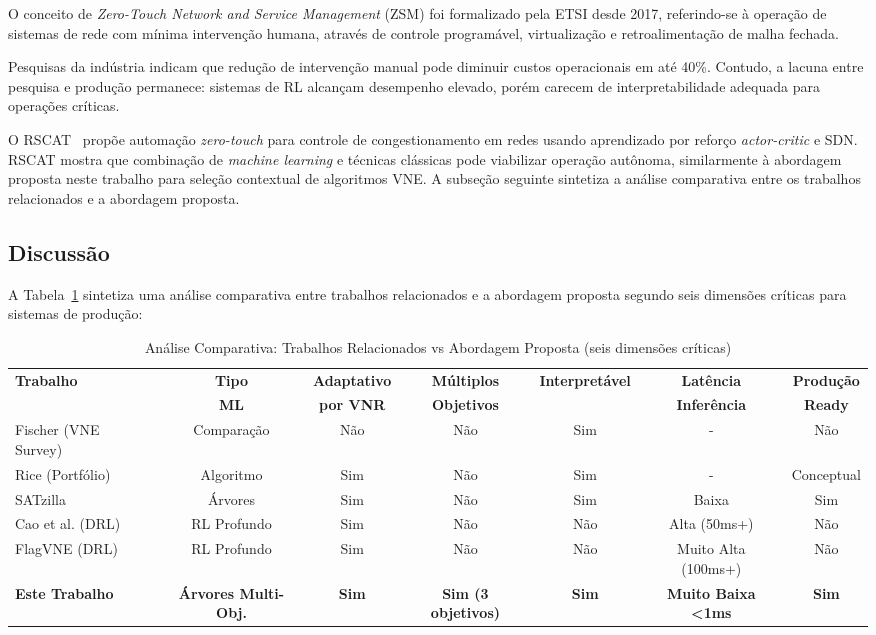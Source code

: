 \documentclass[conference]{IEEEtran}
\begin{document}
O conceito de \textit{Zero-Touch Network and Service Management} (ZSM) foi formalizado pela ETSI desde 2017, referindo-se à operação de sistemas de rede com mínima intervenção humana, através de controle programável, virtualização e retroalimentação de malha fechada.

Pesquisas da indústria indicam que redução de intervenção manual pode diminuir custos operacionais em até 40\%.
Contudo, a lacuna entre pesquisa e produção permanece: sistemas de RL alcançam desempenho elevado, porém carecem de interpretabilidade adequada para operações críticas.

O RSCAT~\cite{diel2023rscat} propõe automação \textit{zero-touch} para controle de congestionamento em redes usando aprendizado por reforço \textit{actor-critic} e SDN.
RSCAT mostra que combinação de \textit{machine learning} e técnicas clássicas pode viabilizar operação autônoma, similarmente à abordagem proposta neste trabalho para seleção contextual de algoritmos VNE. A subseção seguinte sintetiza a análise comparativa entre os trabalhos relacionados e a abordagem proposta.

\subsection{Discussão}

A Tabela~\ref{tab:related-work} sintetiza uma análise comparativa entre trabalhos relacionados e a abordagem proposta segundo seis dimensões críticas para sistemas de produção:

\begin{table}[t]
\centering
\caption{Análise Comparativa: Trabalhos Relacionados vs Abordagem Proposta (seis dimensões críticas)}
\label{tab:related-work}
\begin{tabular}{lcccccc}
\toprule
\textbf{Trabalho} & \textbf{Tipo} & \textbf{Adaptativo} & \textbf{Múltiplos} & \textbf{Interpretável} & \textbf{Latência} & \textbf{Produção} \\
                  & \textbf{ML} & \textbf{por VNR} & \textbf{Objetivos} &                       & \textbf{Inferência} & \textbf{Ready} \\
\midrule
Fischer (VNE Survey) & Comparação & Não & Não & Sim & - & Não \\
Rice (Portfólio) & Algoritmo & Sim & Não & Sim & - & Conceptual \\
SATzilla & Árvores & Sim & Não & Sim & Baixa & Sim \\
Cao et al. (DRL) & RL Profundo & Sim & Não & Não & Alta (50ms+) & Não \\
FlagVNE (DRL) & RL Profundo & Sim & Não & Não & Muito Alta (100ms+) & Não \\
\midrule
\textbf{Este Trabalho} & \textbf{Árvores Multi-Obj.} & \textbf{Sim} & \textbf{Sim (3 objetivos)} & \textbf{Sim} & \textbf{Muito Baixa <1ms} & \textbf{Sim} \\
\bottomrule
\end{tabular}
\end{table}
\end{document}
